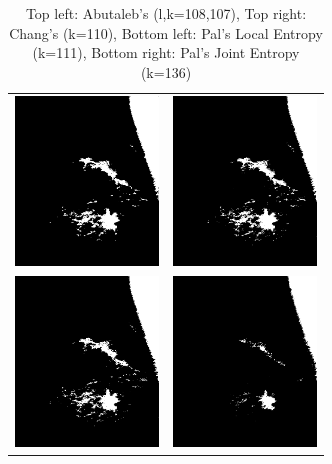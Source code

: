\documentclass[journal]{IEEEtran}
\begin{document}
\begin{table}[!h]
\centering
\begin{tabular}{cc}
\includegraphics[width=1.5in]{../results/breast_abutaleb.png} &
\includegraphics[width=1.5in]{../results/breast_chang.png} \\
\newline
\includegraphics[width=1.5in]{../results/breast_le_pal.png} &
\includegraphics[width=1.5in]{../results/breast_je_pal.png} \\
\end{tabular}
\caption{Top left: Abutaleb's (l,k=108,107), Top right: Chang's (k=110), Bottom left: Pal's Local Entropy (k=111), Bottom right: Pal's Joint Entropy (k=136)}
\label{tab:breastTable2}
\end{table}
\end{document}
